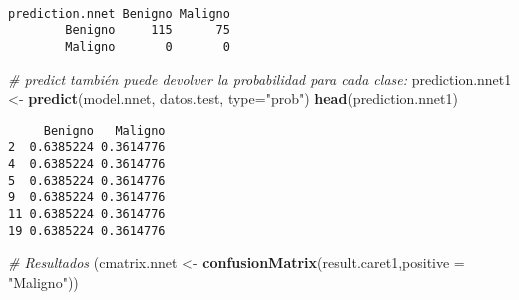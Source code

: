 \documentclass[
]{article}
\newenvironment{Shaded}{\begin{snugshade}}{\end{snugshade}}
\newcommand{\CommentTok}[1]{\textcolor[rgb]{0.56,0.35,0.01}{\textit{#1}}}
\newcommand{\DataTypeTok}[1]{\textcolor[rgb]{0.13,0.29,0.53}{#1}}
\newcommand{\DecValTok}[1]{\textcolor[rgb]{0.00,0.00,0.81}{#1}}
\newcommand{\KeywordTok}[1]{\textcolor[rgb]{0.13,0.29,0.53}{\textbf{#1}}}
\newcommand{\NormalTok}[1]{#1}
\newcommand{\OperatorTok}[1]{\textcolor[rgb]{0.81,0.36,0.00}{\textbf{#1}}}
\newcommand{\OtherTok}[1]{\textcolor[rgb]{0.56,0.35,0.01}{#1}}
\newcommand{\StringTok}[1]{\textcolor[rgb]{0.31,0.60,0.02}{#1}}
\begin{document}
\begin{Shaded}
\end{Shaded}

\begin{verbatim}
               
prediction.nnet Benigno Maligno
        Benigno     115      75
        Maligno       0       0
\end{verbatim}

\begin{Shaded}
\begin{Highlighting}[]
\CommentTok{# predict también puede devolver la probabilidad para cada clase:}
\NormalTok{prediction.nnet1 <-}\StringTok{ }\KeywordTok{predict}\NormalTok{(model.nnet, datos.test, }\DataTypeTok{type=}\StringTok{"prob"}\NormalTok{)  }
\KeywordTok{head}\NormalTok{(prediction.nnet1)}
\end{Highlighting}
\end{Shaded}

\begin{verbatim}
     Benigno   Maligno
2  0.6385224 0.3614776
4  0.6385224 0.3614776
5  0.6385224 0.3614776
9  0.6385224 0.3614776
11 0.6385224 0.3614776
19 0.6385224 0.3614776
\end{verbatim}

\begin{Shaded}
\begin{Highlighting}[]
\CommentTok{# Resultados}
\NormalTok{(cmatrix.nnet <-}\StringTok{ }\KeywordTok{confusionMatrix}\NormalTok{(result.caret1,}\DataTypeTok{positive =} \StringTok{"Maligno"}\NormalTok{))}
\end{Highlighting}
\end{Shaded}
\end{document}
